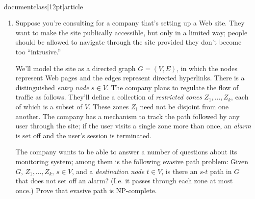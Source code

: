 \\documentclass[12pt]{article}
\begin{document}
\begin{enumerate}

\item 

Suppose you're consulting for a company
that's setting up a Web site.
They want to make the site publically accessible, but only
in a limited way; people should be allowed to
navigate through the site provided they don't
become too ``intrusive.''

We'll model the site as a directed graph $G = (V,E)$,
in which the nodes represent Web pages and
the edges represent directed hyperlinks.
There is a distinguished {\em entry node} $s \in V$.
The company plans to regulate the flow of traffic as follows.
They'll define a collection of {\em restricted zones}
$Z_1, \ldots, Z_k$, each of which is a subset of $V$.
These zones $Z_i$ need not be disjoint from one another.
The company has a mechanism to track the path followed by
any user through the site; if the user visits
a single zone more than once, an {\em alarm} is
set off and the user's session is terminated.

The company wants to be able to answer a number
of questions about its monitoring system;
among them is the following {\sc evasive path} problem:
Given $G$, $Z_1, \ldots, Z_k$, $s \in V$, and
a {\em destination node} $t \in V$,
is there an $s$-$t$ path in $G$ that does not
set off an alarm?  (I.e. it passes through each
zone at most once.)
Prove that {\sc evasive path} is NP-complete.

\end{enumerate}
\end{document}
